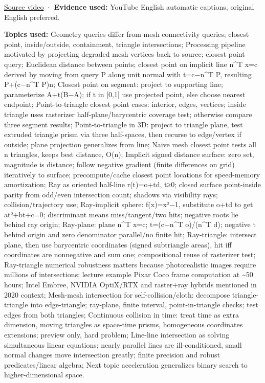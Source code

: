 \hypertarget{04-visual-computing-ii-ch036-cmu-12---geometric-queries}{}

\href{https://www.youtube.com/watch?v=GPPyUT9Pytw}{Source video} · \textbf{Evidence used:} YouTube English automatic captions, original English preferred.

\textbf{Topics used:} Geometry queries differ from mesh connectivity queries; closest point, inside/outside, containment, triangle intersections; Processing pipeline motivated by projecting degraded mesh vertices back to source; closest point query; Euclidean distance between points; closest point on implicit line n\^{}T x=c derived by moving from query P along unit normal with t=c−n\^{}T P, resulting P+(c−n\^{}T P)n; Closest point on segment: project to supporting line; parameterize A+t(B−A); if t in {[}0,1{]} use projected point, else choose nearest endpoint; Point-to-triangle closest point cases: interior, edges, vertices; inside triangle uses rasterizer half-plane/barycentric coverage test; otherwise compare three segment results; Point-to-triangle in 3D: project to triangle plane, test extruded triangle prism via three half-spaces, then recurse to edge/vertex if outside; plane projection generalizes from line; Naive mesh closest point tests all n triangles, keeps best distance, O(n); Implicit signed distance surface: zero set, magnitude is distance; follow negative gradient (finite differences on grid) iteratively to surface; precompute/cache closest point locations for speed-memory amortization; Ray as oriented half-line r(t)=o+td, t≥0; closed surface point-inside parity from odd/even intersection count; shadows via visibility rays; collision/trajectory use; Ray-implicit sphere: f(x)=\textbar\textbar x\textbar\textbar²−1, substitute o+td to get at²+bt+c=0; discriminant means miss/tangent/two hits; negative roots lie behind ray origin; Ray-plane: plane n\^{}T x=c; t=(c−n\^{}T o)/(n\^{}T d); negative t behind origin and zero denominator parallel/no finite hit; Ray-triangle: intersect plane, then use barycentric coordinates (signed subtriangle areas), hit iff coordinates are nonnegative and sum one; compositional reuse of rasterizer test; Ray-triangle numerical robustness matters because photorealistic images require millions of intersections; lecture example Pixar Coco frame computation at \textasciitilde50 hours; Intel Embree, NVIDIA OptiX/RTX and raster+ray hybrids mentioned in 2020 context; Mesh-mesh intersection for self-collision/cloth: decompose triangle-triangle into edge-triangle; ray-plane, finite interval, point-in-triangle checks; test edges from both triangles; Continuous collision in time: treat time as extra dimension, moving triangles as space-time prisms, homogeneous coordinates extensions; preview only, hard problem; Line-line intersection as solving simultaneous linear equations; nearly parallel lines are ill-conditioned, small normal changes move intersection greatly; finite precision and robust predicates/linear algebra; Next topic acceleration generalizes binary search to higher-dimensional space.

